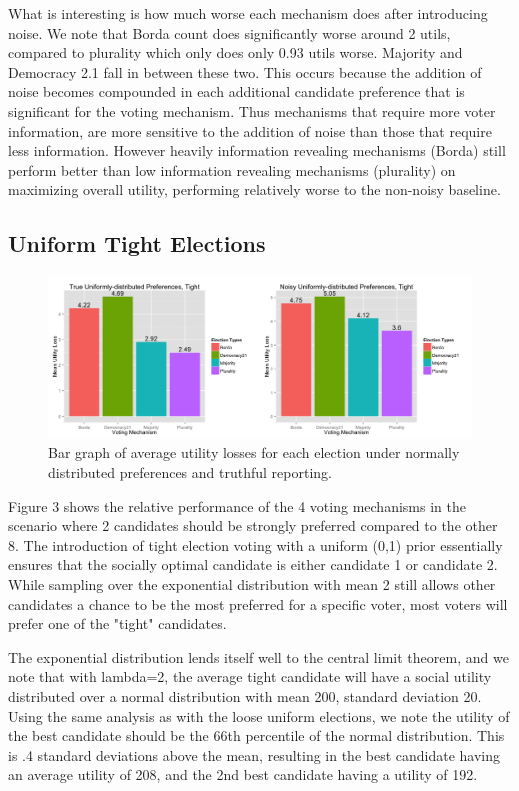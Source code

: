 \documentclass[11pt]{scrartcl}
\begin{document}
What is interesting is how much worse each mechanism does after introducing noise. We note that Borda count does significantly worse around 2 utils, compared to plurality which only does only 0.93 utils worse. Majority and Democracy 2.1 fall in between these two. This occurs because the addition of noise becomes compounded in each additional candidate preference that is significant for the voting mechanism. Thus mechanisms that require more voter information, are more sensitive to the addition of noise than those that require less information. However heavily information revealing mechanisms (Borda) still perform better than low information revealing mechanisms (plurality) on maximizing overall utility, performing relatively worse to the non-noisy baseline.


\subsection{Uniform Tight Elections}

\begin{figure}[H]\center
\includegraphics[scale=0.38]{uniform_tight_noisy.png}
\caption{Bar graph of average utility losses for each election under normally distributed preferences and truthful reporting.}
\end{figure}

Figure 3 shows the relative performance of the 4 voting mechanisms in the scenario where 2 candidates should be strongly preferred compared to the other 8. The introduction of tight election voting with a uniform (0,1) prior essentially ensures that the socially optimal candidate is either candidate 1 or candidate 2. While sampling over the exponential distribution with mean 2 still allows other candidates a chance to be the most preferred for a specific voter, most voters will prefer one of the "tight" candidates.

The exponential distribution lends itself well to the central limit theorem, and we note that with lambda=2, the average tight candidate will have a social utility distributed over a normal distribution with mean 200, standard deviation 20. Using the same analysis as with the loose uniform elections, we note the utility of the best candidate should be the $66$th percentile of the normal distribution. This is .4 standard deviations above the mean, resulting in the best candidate having an average utility of 208, and the 2nd best candidate having a utility of 192.
\end{document}
